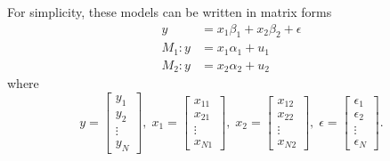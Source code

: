 \documentclass{monashthesis}
\begin{document}
For simplicity, these models can be written in matrix forms
\begin{align*}
y &= x_1 \beta_{1} + x_2 \beta_{2} + \epsilon \\
M_1 : y &= x_1 \alpha_{1} + u_1 \\
M_2 : y &= x_2 \alpha_{2} + u_2
\end{align*}
where
\[
     {y}=\begin{bmatrix}
           y_{1} \\
           y_{2} \\
           \vdots \\
           y_{N}
         \end{bmatrix},\;
     {x_1}=\begin{bmatrix}
           x_{11} \\
           x_{21} \\
           \vdots \\
           x_{N1}
         \end{bmatrix},\;
    {x_2}=\begin{bmatrix}
           x_{12} \\
           x_{22} \\
           \vdots \\
           x_{N2}
         \end{bmatrix},\;
    {\epsilon}=\begin{bmatrix}
           \epsilon_{1} \\
           \epsilon_{2} \\
           \vdots \\
           \epsilon_{N}
         \end{bmatrix}.
\]
\end{document}
